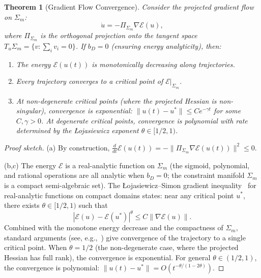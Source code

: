 \documentclass[lettersize,journal]{IEEEtran}
\newtheorem{theorem}{Theorem}
\begin{document}
\begin{theorem}[Gradient Flow Convergence]
\label{thm:gradient-flow}
Consider the projected gradient flow on $\Sigma_m$:
\begin{equation}
\dot{u} = -\Pi_{\Sigma_m} \nabla\mathcal{E}(u),
\end{equation}
where $\Pi_{\Sigma_m}$ is the orthogonal projection onto the tangent space $T_u\Sigma_m = \{v : \sum_i v_i = 0\}$. If $b_D = 0$ (ensuring energy analyticity), then:
\begin{enumerate}
\item[(a)] The energy $\mathcal{E}(u(t))$ is monotonically decreasing along trajectories.
\item[(b)] Every trajectory converges to a critical point of $\mathcal{E}|_{\Sigma_m}$.
\item[(c)] At non-degenerate critical points (where the projected Hessian is non-singular), convergence is exponential: $\|u(t) - u^*\| \leq Ce^{-\gamma t}$ for some $C, \gamma > 0$. At degenerate critical points, convergence is polynomial with rate determined by the \L{}ojasiewicz exponent $\theta \in [1/2, 1)$.
\end{enumerate}
\end{theorem}

\begin{proof}[Proof sketch]
(a) By construction, $\frac{d}{dt}\mathcal{E}(u(t)) = -\|\Pi_{\Sigma_m}\nabla\mathcal{E}(u(t))\|^2 \leq 0$.

(b,c) The energy $\mathcal{E}$ is a real-analytic function on $\Sigma_m$ (the sigmoid, polynomial, and rational operations are all analytic when $b_D = 0$; the constraint manifold $\Sigma_m$ is a compact semi-algebraic set). The \L{}ojasiewicz--Simon gradient inequality~\cite{Lojasiewicz1965,Simon1983} for real-analytic functions on compact domains states: near any critical point $u^*$, there exists $\theta \in [1/2, 1)$ such that
\begin{equation}
|\mathcal{E}(u) - \mathcal{E}(u^*)|^\theta \leq C\|\nabla\mathcal{E}(u)\|.
\end{equation}
Combined with the monotone energy decrease and the compactness of $\Sigma_m$, standard arguments (see, e.g.,~\cite{Chill2003}) give convergence of the trajectory to a single critical point. When $\theta = 1/2$ (the non-degenerate case, where the projected Hessian has full rank), the convergence is exponential. For general $\theta \in (1/2, 1)$, the convergence is polynomial: $\|u(t) - u^*\| = O(t^{-\theta/(1-2\theta)})$.
\end{proof}
\end{document}
